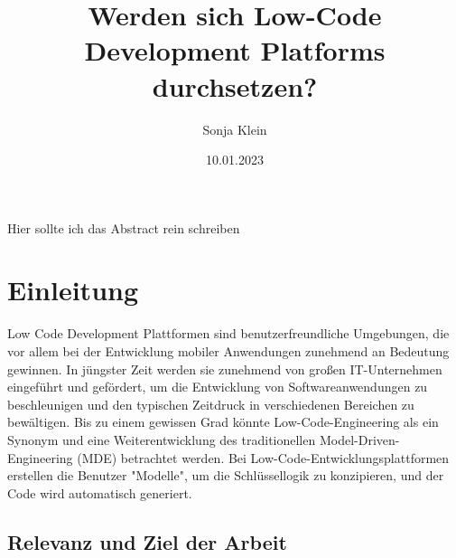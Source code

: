 \documentclass{article}
\title{Werden sich Low-Code Development Platforms durchsetzen?}
\author{Sonja Klein}
\date{10.01.2023}
\begin{document}
	
	Hier sollte ich das Abstract rein schreiben
	
	\maketitle	
	\tableofcontents	
	\newpage
	
	\section{Einleitung}
	
	Low Code Development Plattformen sind benutzerfreundliche Umgebungen, die vor allem bei der Entwicklung mobiler Anwendungen zunehmend an Bedeutung gewinnen. In jüngster Zeit werden sie zunehmend von großen IT-Unternehmen eingeführt und gefördert, um die Entwicklung von Softwareanwendungen zu beschleunigen und den typischen Zeitdruck in verschiedenen Bereichen zu bewältigen. Bis zu einem gewissen Grad könnte Low-Code-Engineering als ein Synonym und eine Weiterentwicklung des traditionellen Model-Driven-Engineering (MDE) betrachtet werden.
	Bei Low-Code-Entwicklungsplattformen erstellen die Benutzer "Modelle", um die Schlüssellogik zu konzipieren, und der Code wird automatisch generiert.
	\cite{Wang.2021}
	
	\subsection{Relevanz und Ziel der Arbeit}
	
	
	
	
	
	
\end{document}
